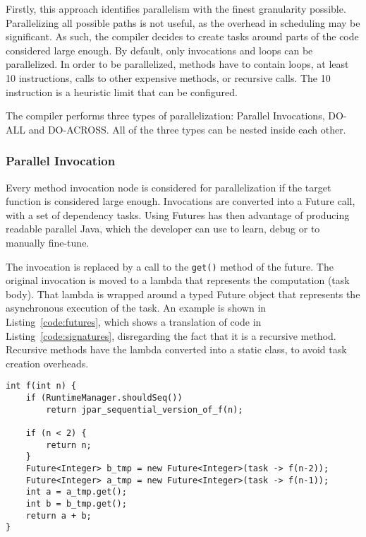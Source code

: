 \documentclass[smallextended]{svjour3}
\begin{document}
Firstly, this approach identifies parallelism with the finest granularity possible. Parallelizing all possible paths is not useful, as the overhead in scheduling may be significant. As such, the compiler decides to create tasks around parts of the code considered large enough. By default, only invocations and loops can be parallelized. In order to be parallelized, methods have to contain loops, at least 10 instructions, calls to other expensive methods, or recursive calls. The 10 instruction is a heuristic limit that can be configured.

The compiler performs three types of parallelization: Parallel Invocations, DO-ALL and DO-ACROSS. All of the three types can be nested inside each other.

\subsubsection{Parallel Invocation}

Every method invocation node is considered for parallelization if the target function is considered large enough. Invocations are converted into a Future call\cite{swaine2010back}, with a set of dependency tasks. Using Futures has then advantage of producing readable parallel Java, which the developer can use to learn, debug or to manually fine-tune.

The invocation is replaced by a call to the \verb|get()| method of the future. The original invocation is moved to a lambda that represents the computation (task body). That lambda is wrapped around a typed Future object that represents the asynchronous execution of the task. An example is shown in Listing~\ref{code:futures}, which shows a translation of code in Listing~\ref{code:signatures}, disregarding the fact that it is a recursive method. Recursive methods have the lambda converted into a static class, to avoid task creation overheads.

\vspace{15mm}

\begin{lstlisting}
int f(int n) {
    if (RuntimeManager.shouldSeq())
        return jpar_sequential_version_of_f(n);

    if (n < 2) {
        return n;
    }
    Future<Integer> b_tmp = new Future<Integer>(task -> f(n-2));
    Future<Integer> a_tmp = new Future<Integer>(task -> f(n-1));
    int a = a_tmp.get();
    int b = b_tmp.get();
    return a + b;
}
\end{lstlisting}
\end{document}
